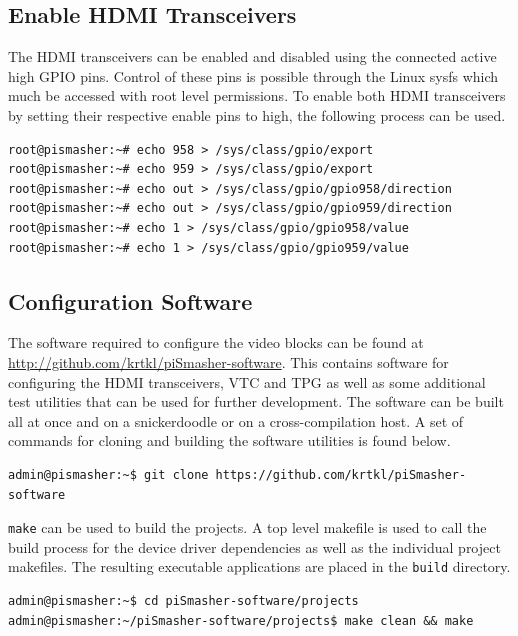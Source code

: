 \documentclass[sfsidenotes, justified]{tufte-handout}
\begin{document}
	\subsection{Enable HDMI Transceivers}
	
	The HDMI transceivers can be enabled and disabled using the connected active high GPIO pins. Control of these pins is possible through the Linux sysfs which much be accessed with root level permissions. To enable both HDMI transceivers by setting their respective enable pins to high, the following process can be used.
	
	\begin{lstlisting}[style=text]
root@pismasher:~# echo 958 > /sys/class/gpio/export
root@pismasher:~# echo 959 > /sys/class/gpio/export
root@pismasher:~# echo out > /sys/class/gpio/gpio958/direction
root@pismasher:~# echo out > /sys/class/gpio/gpio959/direction
root@pismasher:~# echo 1 > /sys/class/gpio/gpio958/value
root@pismasher:~# echo 1 > /sys/class/gpio/gpio959/value
	\end{lstlisting}
	
	\subsection{Configuration Software}
	
	The software required to configure the video blocks can be found at \url{http://github.com/krtkl/piSmasher-software}. This contains software for configuring the HDMI transceivers, VTC and TPG as well as some additional test utilities that can be used for further development. The software can be built all at once and on a snickerdoodle or on a cross-compilation host. A set of commands for cloning and building the software utilities is found below.
	
	\begin{fullwidth}
	\begin{lstlisting}[caption=Clone piSmasher Software Repository, captionpos=b]
admin@pismasher:~$ git clone https://github.com/krtkl/piSmasher-software
	\end{lstlisting}
	\end{fullwidth}

\texttt{make} can be used to build the projects. A top level makefile is used to call the build process for the device driver dependencies as well as the individual project makefiles. The resulting executable applications are placed in the \texttt{build} directory.
	
	\begin{fullwidth}
	\begin{lstlisting}[style=text]
admin@pismasher:~$ cd piSmasher-software/projects
admin@pismasher:~/piSmasher-software/projects$ make clean && make
	\end{lstlisting}
	\end{fullwidth}
\end{document}
